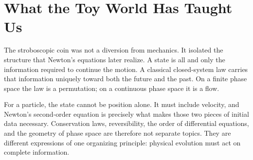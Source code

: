 \section{What the Toy World Has Taught Us}

The stroboscopic coin was not a diversion from mechanics. It isolated the structure that Newton's equations later realize. A state is all and only the information required to continue the motion. A classical closed-system law carries that information uniquely toward both the future and the past. On a finite phase space the law is a permutation; on a continuous phase space it is a flow.

For a particle, the state cannot be position alone. It must include velocity, and Newton's second-order equation is precisely what makes those two pieces of initial data necessary. Conservation laws, reversibility, the order of differential equations, and the geometry of phase space are therefore not separate topics. They are different expressions of one organizing principle: physical evolution must act on complete information.
